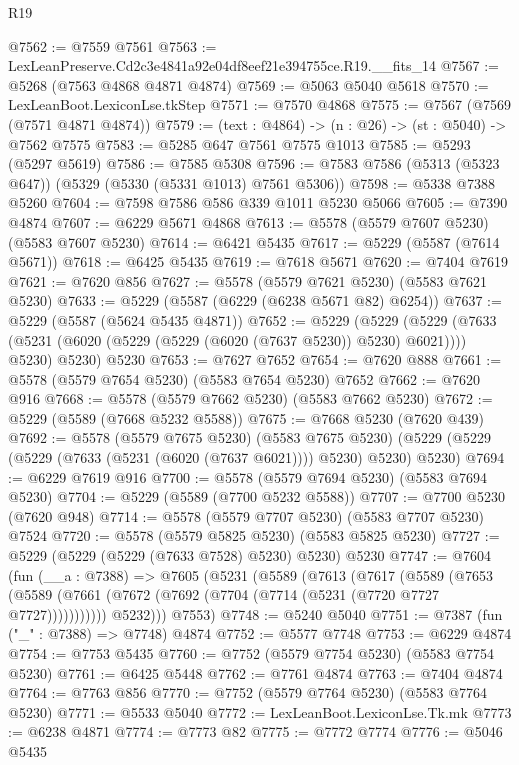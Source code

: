 \begin{lexlean}{R19}
\begin{coremodule}
@7562 := @7559 @7561
@7563 := LexLeanPreserve.Cd2c3e4841a92e04df8eef21e394755ce.R19.__fits_14
@7567 := @5268 (@7563 @4868 @4871 @4874)
@7569 := @5063 @5040 @5618
@7570 := LexLeanBoot.LexiconLse.tkStep
@7571 := @7570 @4868
@7575 := @7567 (@7569 (@7571 @4871 @4874))
@7579 := (text : @4864) -> (n : @26) -> (st : @5040) -> @7562 @7575
@7583 := @5285 @647 @7561 @7575 @1013
@7585 := @5293 (@5297 @5619)
@7586 := @7585 @5308
@7596 := @7583 @7586 (@5313 (@5323 @647)) (@5329 (@5330 (@5331 @1013) @7561 @5306))
@7598 := @5338 @7388 @5260
@7604 := @7598 @7586 @586 @339 @1011 @5230 @5066
@7605 := @7390 @4874
@7607 := @6229 @5671 @4868
@7613 := @5578 (@5579 @7607 @5230) (@5583 @7607 @5230)
@7614 := @6421 @5435
@7617 := @5229 (@5587 (@7614 @5671))
@7618 := @6425 @5435
@7619 := @7618 @5671
@7620 := @7404 @7619
@7621 := @7620 @856
@7627 := @5578 (@5579 @7621 @5230) (@5583 @7621 @5230)
@7633 := @5229 (@5587 (@6229 (@6238 @5671 @82) @6254))
@7637 := @5229 (@5587 (@5624 @5435 @4871))
@7652 := @5229
    (@5229
      (@5229 (@7633 (@5231 (@6020 (@5229 (@5229 (@6020 (@7637 @5230)) @5230) @6021)))) @5230)
      @5230)
    @5230
@7653 := @7627 @7652
@7654 := @7620 @888
@7661 := @5578 (@5579 @7654 @5230) (@5583 @7654 @5230) @7652
@7662 := @7620 @916
@7668 := @5578 (@5579 @7662 @5230) (@5583 @7662 @5230)
@7672 := @5229 (@5589 (@7668 @5232 @5588))
@7675 := @7668 @5230 (@7620 @439)
@7692 := @5578
    (@5579 @7675 @5230)
    (@5583 @7675 @5230)
    (@5229 (@5229 (@5229 (@7633 (@5231 (@6020 (@7637 @6021)))) @5230) @5230) @5230)
@7694 := @6229 @7619 @916
@7700 := @5578 (@5579 @7694 @5230) (@5583 @7694 @5230)
@7704 := @5229 (@5589 (@7700 @5232 @5588))
@7707 := @7700 @5230 (@7620 @948)
@7714 := @5578 (@5579 @7707 @5230) (@5583 @7707 @5230) @7524
@7720 := @5578 (@5579 @5825 @5230) (@5583 @5825 @5230)
@7727 := @5229 (@5229 (@5229 (@7633 @7528) @5230) @5230) @5230
@7747 := @7604
    (fun (__a : @7388) =>
    @7605
      (@5231
        (@5589
          (@7613
            (@7617
              (@5589
                (@7653
                  (@5589 (@7661 (@7672 (@7692 (@7704 (@7714 (@5231 (@7720 @7727 @7727)))))))))))
            @5232)))
      @7553)
@7748 := @5240 @5040
@7751 := @7387 (fun ("_" : @7388) => @7748) @4874
@7752 := @5577 @7748
@7753 := @6229 @4874
@7754 := @7753 @5435
@7760 := @7752 (@5579 @7754 @5230) (@5583 @7754 @5230)
@7761 := @6425 @5448
@7762 := @7761 @4874
@7763 := @7404 @4874
@7764 := @7763 @856
@7770 := @7752 (@5579 @7764 @5230) (@5583 @7764 @5230)
@7771 := @5533 @5040
@7772 := LexLeanBoot.LexiconLse.Tk.mk
@7773 := @6238 @4871
@7774 := @7773 @82
@7775 := @7772 @7774
@7776 := @5046 @5435

\end{coremodule}
\end{lexlean}
